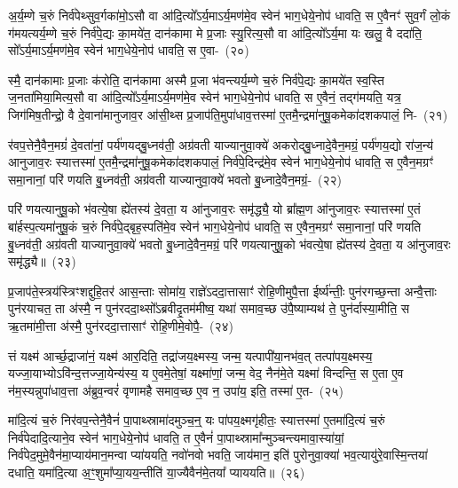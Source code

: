 {}

अ॒र्य॒म्णे च॒रुं निर्व॑पेथ्सुव॒र्गका॑मो॒\-ऽसौ वा आ॑दि॒त्यो᳚\-ऽर्य॒मा\-ऽर्य॒मण॑मे॒व स्वेन॑ भाग॒\-धेये॒नोप॑ धावति॒ स ए॒वैनꣳ॑ सुव॒र्गं लो॒कं ग॑मयत्यर्य॒म्णे च॒रुं निर्व॑पे॒द्यः का॒मये॑त॒ दान॑कामा मे प्र॒जाः स्यु॒रित्य॒सौ वा आ॑दि॒त्यो᳚\-ऽर्य॒मा यः खलु॒ वै ददा॑ति॒ सो᳚\-ऽर्य॒मा\-ऽर्य॒मण॑मे॒व स्वेन॑ भाग॒\-धेये॒नोप॑ धावति॒ स ए॒वा-~(२०)\ip

स्मै॒ दान॑कामाः प्र॒जाः क॑रोति॒ दान॑कामा अस्मै प्र॒जा भ॑वन्त्यर्य॒म्णे च॒रुं निर्व॑पे॒द्यः का॒मये॑त स्व॒स्ति ज॒नता॑मिया॒मित्य॒सौ वा आ॑दि॒त्यो᳚\-ऽर्य॒मा\-ऽर्य॒मण॑मे॒व स्वेन॑ भाग॒\-धेये॒नोप॑ धावति॒ स ए॒वैनं॒ तद्ग॑मयति॒ यत्र॒ जिग॑मिष॒तीन्द्रो॒ वै दे॒वाना॑मानुजाव॒र आ॑सी॒थ्स प्र॒जा\-प॑ति॒मुपा॑धाव॒त्तस्मा॑ ए॒तमै॒न्द्रमा॑नुषू॒कमेका॑\-दश\-कपालं॒ नि-~(२१)\ip

र॑वप॒त्तेनै॒वैन॒मग्रं॑ दे॒वता॑नां॒ पर्य॑णयद्बु॒ध्नव॑ती॒ अग्र॑वती याज्यानुवा॒क्ये॑ अकरोद्बु॒ध्नादे॒वैन॒मग्रं॒ पर्य॑णय॒द्यो रा॑ज॒न्य॑ आनुजाव॒रः स्यात्तस्मा॑ ए॒तमै॒न्द्रमा॑नुषू॒कमेका॑\-दश\-कपालं॒ निर्व॑पे॒दिन्द्र॑मे॒व स्वेन॑ भाग॒\-धेये॒नोप॑ धावति॒ स ए॒वैन॒मग्रꣳ॑ समा॒नानां॒ परि॑ णयति बु॒ध्नव॑ती॒ अग्र॑वती याज्यानुवा॒क्ये॑ भवतो बु॒ध्नादे॒वैन॒मग्रं॒-~(२२)\ip

परि॑ णयत्यानुषू॒को भ॑वत्ये॒षा ह्ये॑तस्य॑ दे॒वता॒ य आ॑नुजाव॒रः समृ॑द्ध्यै॒ यो ब्रा᳚ह्म॒ण आ॑नुजाव॒रः स्यात्तस्मा॑ ए॒तं बा॑र्\mbox{}हस्प॒त्यमा॑नुषू॒कं च॒रुं निर्व॑पे॒द्बृह॒स्पति॑मे॒व स्वेन॑ भाग॒\-धेये॒नोप॑ धावति॒ स ए॒वैन॒मग्रꣳ॑ समा॒नानां॒ परि॑ णयति बु॒ध्नव॑ती॒ अग्र॑वती याज्यानुवा॒क्ये॑ भवतो बु॒ध्नादे॒वैन॒मग्रं॒ परि॑ णयत्यानुषू॒को भ॑वत्ये॒षा ह्ये॑तस्य॑ दे॒वता॒ य आ॑नुजाव॒रः समृ॑द्ध्यै॥~(२३)\ip

{\anuvakamend[{ए॒व निरग्र॑मे॒तस्य॑ च॒त्वारि॑ च}]}

प्र॒जा\-प॑ते॒स्त्रय॑स्त्रिꣳशद्दुहि॒तर॑ आस॒न्ताः सोमा॑य॒ राज्ञे॑\-ऽददा॒त्तासाꣳ॑ रोहि॒णीमुपै॒त्ता ईर्ष्य॑न्तीः॒ पुन॑रगच्छ॒न्ता अन्वै॒त्ताः पुन॑रयाचत॒ ता अ॑स्मै॒ न पुन॑रददा॒थ्सो᳚\-ऽब्रवीदृ॒तम॑मीष्व॒ यथा॑ समाव॒च्छ उ॑पै॒ष्याम्यथ॑ ते॒ पुन॑र्दास्या॒मीति॒ स ऋ॒तमा॑मी॒त्ता अ॑स्मै॒ पुन॑रददा॒त्तासाꣳ॑ रोहि॒णीमे॒वोपै॒-~(२४)\ip

त्तं यक्ष्म॑ आर्च्छ॒द्राजा॑नं॒ यक्ष्म॑ आर॒दिति॒ तद्रा॑जय॒क्ष्मस्य॒ जन्म॒ यत्पापी॑या॒नभ॑व॒त् तत्पा॑प\-य॒क्ष्मस्य॒ यज्जा॒याभ्यो\-ऽवि॑न्द॒त्तज्जा॒येन्य॑स्य॒ य ए॒वमे॒तेषां॒ यक्ष्मा॑णां॒ जन्म॒ वेद॒ नैन॑मे॒ते यक्ष्मा॑ विन्दन्ति॒ स ए॒ता ए॒व न॑म॒स्यन्नुपा॑धाव॒त्ता अ॑ब्रुव॒न्वरं॑ वृणामहै समाव॒च्छ ए॒व न॒ उपा॑य॒ इति॒ तस्मा॑ ए॒त-~(२५)\ip

मा॑दि॒त्यं च॒रुं निर॑वप॒न्तेनै॒वैनं॑ पा॒पाथ्स्रामा॑दमुञ्च॒न्॒ यः पा॑पय॒क्ष्मगृ॑हीतः॒ स्यात्तस्मा॑ ए॒तमा॑दि॒त्यं च॒रुं निर्व॑पेदादि॒त्याने॒व स्वेन॑ भाग॒\-धेये॒नोप॑ धावति॒ त ए॒वैनं॑ पा॒पाथ्स्रामा᳚न्मुञ्च\-न्त्यमा\-वा॒स्या॑यां॒ निर्व॑पेद॒मुमे॒वैन॑मा॒प्याय॑मान॒मन्वा प्या॑ययति॒ नवो॑नवो भवति॒ जाय॑\-मान॒ इति॑ पुरोनुवा॒क्या॑ भव॒त्यायु॑रे॒वास्मि॒न्तया॑ दधाति॒ यमा॑\-दि॒त्या अ॒ꣳ॒शुमा᳚प्या॒यय॒न्तीति॑ या॒ज्यैवैन॑मे॒तया᳚ प्याययति॥~(२६)\ip

